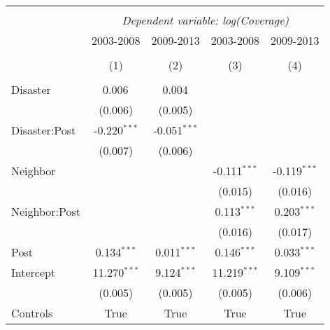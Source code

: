 
\begin{tabular}{@{\extracolsep{5pt}}lcccc}
\\[-1.8ex]\hline
\hline \\[-1.8ex]
& \multicolumn{4}{c}{\textit{Dependent variable: log(Coverage)}} \
\cr \cline{2-5}
\\[-1.8ex] & \multicolumn{1}{c}{2003-2008} & \multicolumn{1}{c}{2009-2013} & \multicolumn{1}{c}{2003-2008} & \multicolumn{1}{c}{2009-2013}  \\
\\[-1.8ex] & (1) & (2) & (3) & (4) \\
\hline \\[-1.8ex]
 Disaster & 0.006$^{}$ & 0.004$^{}$ & & \\
& (0.006) & (0.005) & & \\
 Disaster:Post & -0.220$^{***}$ & -0.051$^{***}$ & & \\
& (0.007) & (0.006) & & \\
 Neighbor & & & -0.111$^{***}$ & -0.119$^{***}$ \\
& & & (0.015) & (0.016) \\
 Neighbor:Post & & & 0.113$^{***}$ & 0.203$^{***}$ \\
& & & (0.016) & (0.017) \\
 Post & 0.134$^{***}$ & 0.011$^{***}$ & 0.146$^{***}$ & 0.033$^{***}$ \\
Intercept & 11.270$^{***}$ & 9.124$^{***}$ & 11.219$^{***}$ & 9.109$^{***}$ \\
& (0.005) & (0.005) & (0.005) & (0.006) \\
Controls & True & True & True & True \\

\end{tabular}
